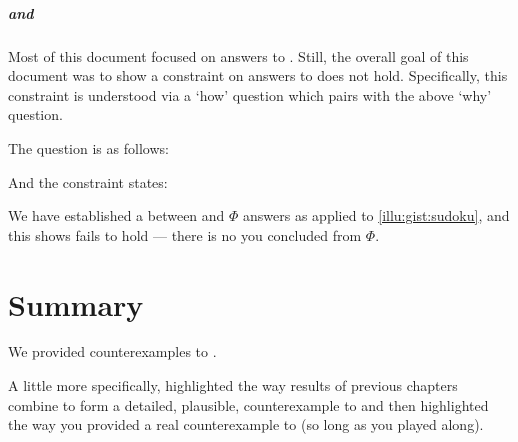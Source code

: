 \subparagraph{\qHow{} and \issueInclusion{}}


\begin{note}
  Most of this document focused on answers to \qWhy{}.
  Still, the overall goal of this document was to show a constraint on answers to \qWhy{} does not hold.
  Specifically, this constraint is understood via a `how' question which pairs with the above `why' question.

  The \qHow{} question is as follows:


  \noindent%
  And the constraint states:

\end{note}


\begin{note}
  We have established a \ros{} between \sudokuRPV{} and \(\Phi\) answers \qWhy{} as applied to \autoref{illu:gist:sudoku}, and this \ros{} shows \issueInclusion{} fails to hold --- there is no  you concluded \sudokuRPV{} from \(\Phi\).
\end{note}



\section*{Summary}
\label{sec:summary-1}

\begin{note}
  We provided counterexamples to \issueInclusion{}.

  A little more specifically, highlighted the way results of previous chapters combine to form a detailed, plausible, counterexample to \issueInclusion{} and then highlighted the way you provided a real counterexample to \issueInclusion{} (so long as you played along).
\end{note}



